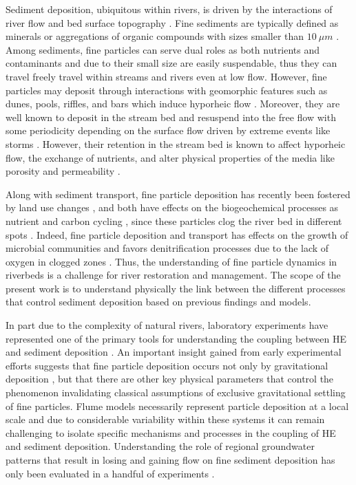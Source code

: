 \documentclass[draft,linenumbers]{agujournal2018}
\begin{document}
Sediment deposition, ubiquitous within rivers, is driven by the interactions of river flow and bed surface topography \citep{Packman2000,Packman2000b,Harvey2012}. Fine sediments are typically defined as minerals or aggregations of organic compounds with sizes smaller than $10 \ \mu m$ \citep{Harvey2012,Drummond2014,Drummond2018}. Among sediments, fine particles can serve dual roles as both nutrients and contaminants and due to their small size are easily suspendable, thus they can travel freely travel within streams and rivers even at low flow. However, fine particles may deposit through interactions with geomorphic features such as dunes, pools, riffles, and bars which induce hyporheic flow \citep{Buendia2014}. Moreover, they are well known to deposit in the stream bed and resuspend into the free flow with some periodicity \citep{Drummond2015} depending on the surface flow driven by extreme events like storms \citep{Drummond2017}. However, their retention in the stream bed is known to affect hyporheic flow, the exchange of nutrients, and alter physical properties of the media like porosity and permeability \citep{Crenshaw2002,Mendoza2017}.

Along with sediment transport, fine particle deposition has recently been fostered by land use changes \citep{Gartner2012,Wohl2015}, and both have effects on the biogeochemical processes as nutrient and carbon cycling \citep{Hope1994,Gottselig2014}, since these particles clog the river bed in different spots \citep{Brunke1999}. Indeed, fine particle deposition and transport has effects on the growth of microbial communities and favors denitrification processes due to the lack of oxygen in clogged zones \citep{Navel2011}. Thus, the understanding of fine particle dynamics in riverbeds is a challenge for river restoration and management. The scope of the present work is to understand physically the link between the different processes that control sediment deposition based on previous findings and models. 

In part due to the complexity of natural rivers, laboratory experiments have represented one of the primary tools for understanding the coupling between HE and sediment deposition \citep{Elliott1997b,Marion2002,Salehin2004a}. An important insight gained from early experimental efforts suggests that fine particle deposition occurs not only by gravitational deposition \citep{Vanoni1974}, but that there are other key physical parameters that control the phenomenon invalidating classical assumptions of exclusive gravitational settling of fine particles. Flume models necessarily represent particle deposition at a local scale and due to considerable variability within these systems it can remain challenging to isolate specific mechanisms and processes in the coupling of HE and sediment deposition. Understanding the role of regional groundwater patterns that result in losing and gaining flow on fine sediment deposition has only been evaluated in a handful of experiments \citep{Fox2014,Fox2018}. 
\end{document}
